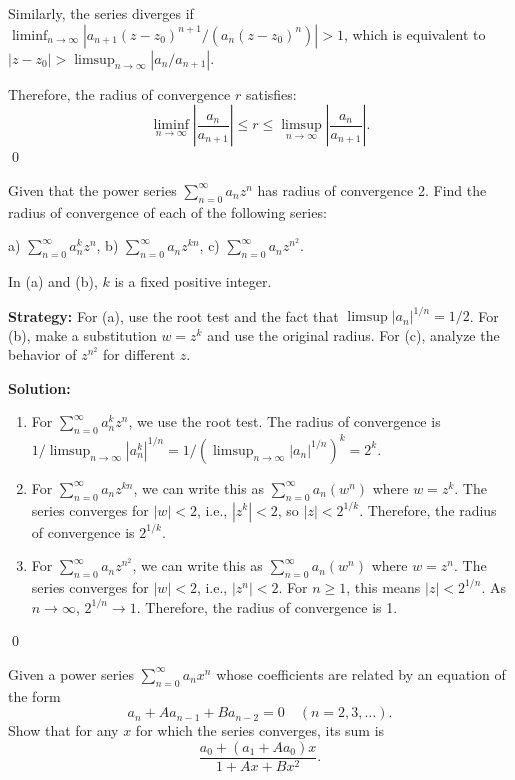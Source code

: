Similarly, the series diverges if \( \liminf_{n\to\infty} |a_{n+1}(z - z_0)^{n+1} / (a_n(z - z_0)^n)| > 1 \), which is equivalent to \( |z - z_0| > \limsup_{n\to\infty} |a_n/a_{n+1}| \).

Therefore, the radius of convergence \( r \) satisfies:
\[\liminf_{n\to\infty} \left| \frac{a_n}{a_{n+1}} \right| \leq r \leq \limsup_{n\to\infty} \left| \frac{a_n}{a_{n+1}} \right|.\]\qed


\begin{problembox}
Given that the power series \( \sum_{n=0}^{\infty} a_nz^n \) has radius of convergence 2. Find the radius of convergence of each of the following series:

a) \( \sum_{n=0}^{\infty} a_n^k z^n \),    b) \( \sum_{n=0}^{\infty} a_nz^{kn} \),    c) \( \sum_{n=0}^{\infty} a_nz^{n^2} \).

In (a) and (b), \( k \) is a fixed positive integer.
\end{problembox}

\noindent\textbf{Strategy:} For (a), use the root test and the fact that \( \limsup |a_n|^{1/n} = 1/2 \). For (b), make a substitution \( w = z^k \) and use the original radius. For (c), analyze the behavior of \( z^{n^2} \) for different \( z \).

\bigskip\noindent\textbf{Solution:}
\begin{enumerate}[label=(\alph*)]
\item For \( \sum_{n=0}^{\infty} a_n^k z^n \), we use the root test. The radius of convergence is \( 1/\limsup_{n\to\infty} |a_n^k|^{1/n} = 1/(\limsup_{n\to\infty} |a_n|^{1/n})^k = 2^k \).

\item For \( \sum_{n=0}^{\infty} a_nz^{kn} \), we can write this as \( \sum_{n=0}^{\infty} a_n(w^n) \) where \( w = z^k \). The series converges for \( |w| < 2 \), i.e., \( |z^k| < 2 \), so \( |z| < 2^{1/k} \). Therefore, the radius of convergence is \( 2^{1/k} \).

\item For \( \sum_{n=0}^{\infty} a_nz^{n^2} \), we can write this as \( \sum_{n=0}^{\infty} a_n(w^n) \) where \( w = z^n \). The series converges for \( |w| < 2 \), i.e., \( |z^n| < 2 \). For \( n \geq 1 \), this means \( |z| < 2^{1/n} \). As \( n \to \infty \), \( 2^{1/n} \to 1 \). Therefore, the radius of convergence is 1.
\end{enumerate}\qed


\begin{problembox}
Given a power series \( \sum_{n=0}^{\infty} a_nx^n \) whose coefficients are related by an equation of the form
\[ a_n + Aa_{n-1} + Ba_{n-2} = 0 \quad (n = 2, 3, \ldots). \]
Show that for any \( x \) for which the series converges, its sum is
\[ \frac{a_0 + (a_1 + Aa_0)x}{1 + Ax + Bx^2}. \]
\end{problembox}

